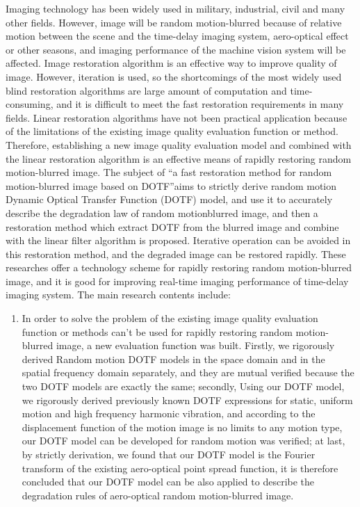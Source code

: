 \begin{englishabstract}
Imaging technology has been widely used in military, industrial, civil and many
other fields. However, image will be random motion-blurred because of relative motion
between the scene and the time-delay imaging system, aero-optical effect or other seasons, and imaging performance of the machine vision system will be affected. Image
restoration algorithm is an effective way to improve quality of image. However, iteration
is used, so the shortcomings of the most widely used blind restoration algorithms are large
amount of computation and time-consuming, and it is difficult to meet the fast restoration
requirements in many fields. Linear restoration algorithms have not been practical application because of the limitations of the existing image quality evaluation function or
method. Therefore, establishing a new image quality evaluation model and combined
with the linear restoration algorithm is an effective means of rapidly restoring random
motion-blurred image.
The subject of “a fast restoration method for random motion-blurred image based
on DOTF”aims to strictly derive random motion Dynamic Optical Transfer Function
(DOTF) model, and use it to accurately describe the degradation law of random motionblurred image, and then a restoration method which extract DOTF from the blurred image
and combine with the linear filter algorithm is proposed. Iterative operation can be avoided in this restoration method, and the degraded image can be restored rapidly. These
researches offer a technology scheme for rapidly restoring random motion-blurred image, and it is good for improving real-time imaging performance of time-delay imaging
system.
The main research contents include:

\begin{enumerate}
\item In order to solve the problem of the existing image quality evaluation function
or methods can’t be used for rapidly restoring random motion-blurred image, a new evaluation function was built. Firstly, we rigorously derived Random motion DOTF models
in the space domain and in the spatial frequency domain separately, and they are mutual
verified because the two DOTF models are exactly the same; secondly, Using our DOTF model, we rigorously derived previously known DOTF expressions for static, uniform
motion and high frequency harmonic vibration, and according to the displacement function of the motion image is no limits to any motion type, our DOTF model can be
developed for random motion was verified; at last, by strictly derivation, we found that
our DOTF model is the Fourier transform of the existing aero-optical point spread function, it is therefore concluded that our DOTF model can be also applied to describe the
degradation rules of aero-optical random motion-blurred image.


\end{enumerate}
\end{englishabstract}
